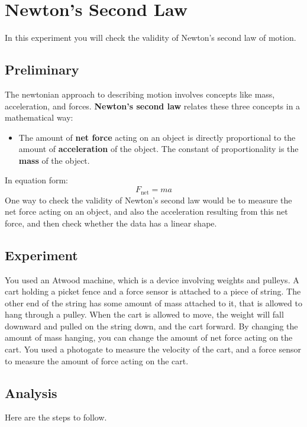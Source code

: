 \chapter{Newton's Second Law}
%
In this experiment you will check the validity of Newton's second law of motion.
%
\section{Preliminary}
%
The newtonian approach to describing motion involves concepts like mass, acceleration, and forces. \textbf{Newton's second law} relates these three concepts in a mathematical way:
\begin{itemize}
    \item The amount of \textbf{net force} acting on an object is directly proportional to the amount of \textbf{acceleration} of the object. The constant of proportionality is the \textbf{mass} of the object.
\end{itemize}
In equation form:
\begin{equation}
    F_{\text{net}} = m a
    \label{eq:04.Fma}
\end{equation}
One way to check the validity of Newton's second law would be to measure the net force acting on an object, and also the acceleration resulting from this net force, and then check whether the data has a linear shape.
%
\section{Experiment}
%
You used an Atwood machine, which is a device involving weights and pulleys. A cart holding a picket fence and a force sensor is attached to a piece of string. The other end of the string has some amount of mass attached to it, that is allowed to hang through a pulley. When the cart is allowed to move, the weight will fall downward and pulled on the string down, and the cart forward. By changing the amount of mass hanging, you can change the amount of net force acting on the cart. You used a photogate to measure the velocity of the cart, and a force sensor to measure the amount of force acting on the cart.
%
\section{Analysis}
%
Here are the steps to follow.
%
